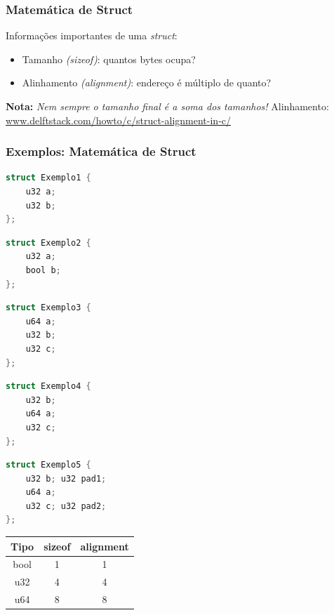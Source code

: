 \documentclass{beamer}
\newcommand{\nota}[1]{\textbf{Nota:}\textit{ #1}}
\newcommand{\tabelasizealign}{%
    \begin{tabular}{|c|c|c|}%
        \hline%
        Tipo & sizeof & alignment \\\hline%
        \hline%
        bool & 1      & 1         \\\hline%
        u32  & 4      & 4         \\\hline%
        u64  & 8      & 8         \\\hline%
    \end{tabular}%
}
\begin{document}
\begin{frame}
    \frametitle{Matemática de Struct}
    Informações importantes de uma \emph{struct}:
    \begin{itemize}
        \item Tamanho \emph{(sizeof)}:
            quantos bytes ocupa?
        \item Alinhamento \emph{(alignment)}:
            endereço é múltiplo de quanto?
    \end{itemize}
    \vfill
    \nota{Nem sempre o \emph{tamanho final}
        é a soma dos \emph{tamanhos}!}
    \vfill
    Alinhamento:
    \url{www.delftstack.com/howto/c/struct-alignment-in-c/}
\end{frame}

\begin{frame}[fragile]
    \frametitle{Exemplos: Matemática de Struct}
    \begin{multicols}{2}
        \begin{lstlisting}[language=C]
struct Exemplo1 {
    u32 a;
    u32 b;
};
        \end{lstlisting}
        \begin{lstlisting}[language=C]
struct Exemplo2 {
    u32 a;
    bool b;
};
        \end{lstlisting}
        \begin{lstlisting}[language=C]
struct Exemplo3 {
    u64 a;
    u32 b;
    u32 c;
};
        \end{lstlisting}
        \columnbreak
        \begin{lstlisting}[language=C]
struct Exemplo4 {
    u32 b;
    u64 a;
    u32 c;
};
        \end{lstlisting}
        \begin{lstlisting}[language=C]
struct Exemplo5 {
    u32 b; u32 pad1;
    u64 a;
    u32 c; u32 pad2;
};
        \end{lstlisting}
        \tabelasizealign{}
    \end{multicols}
\end{frame}
\end{document}

